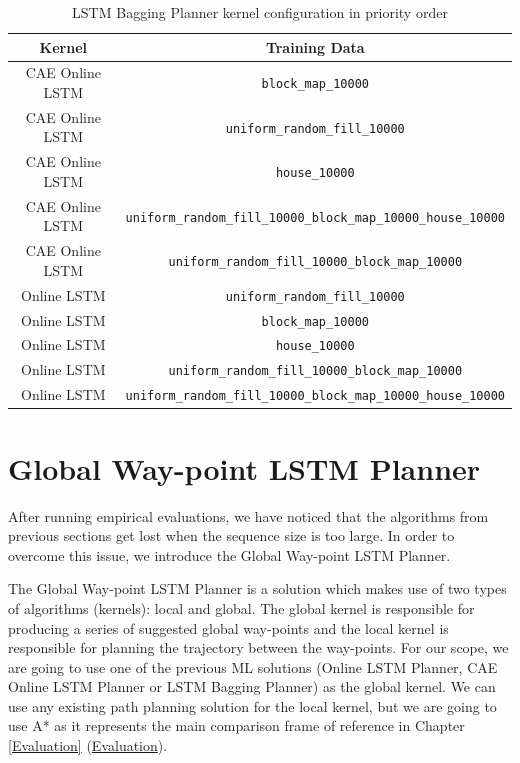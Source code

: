 \begin{table}[h!]
    \centering
    \begin{tabular}{|c|c|}
         \hline
         \textbf{Kernel} & \textbf{Training Data} \\
         \hline
         \hline
         CAE Online LSTM & \texttt{block\_map\_10000} \\
         \hline
         CAE Online LSTM & \texttt{uniform\_random\_fill\_10000} \\
         \hline
         CAE Online LSTM & \texttt{house\_10000} \\
         \hline
         CAE Online LSTM & \texttt{uniform\_random\_fill\_10000\_block\_map\_10000\_house\_10000} \\
         \hline
         CAE Online LSTM & \texttt{uniform\_random\_fill\_10000\_block\_map\_10000} \\
         \hline
         \hline
         Online LSTM & \texttt{uniform\_random\_fill\_10000} \\
         \hline
         Online LSTM & \texttt{block\_map\_10000} \\
         \hline
         Online LSTM & \texttt{house\_10000} \\
         \hline
         Online LSTM & \texttt{uniform\_random\_fill\_10000\_block\_map\_10000} \\
         \hline
         Online LSTM & \texttt{uniform\_random\_fill\_10000\_block\_map\_10000\_house\_10000} \\
         \hline
    \end{tabular}
    \caption{LSTM Bagging Planner kernel configuration in priority order}
    \label{tab:LSTM Bagging Planner config}
\end{table}

\pagebreak

\section{Global Way-point LSTM Planner} \label{sec: way point nav}
After running empirical evaluations, we have noticed that the algorithms from previous sections get lost when the sequence size is too large. In order to overcome this issue, we introduce the Global Way-point LSTM Planner.

The Global Way-point LSTM Planner is a solution which makes use of two types of algorithms (kernels): local and global. The global kernel is responsible for producing a series of suggested global way-points and the local kernel is responsible for planning the trajectory between the way-points. For our scope, we are going to use one of the previous ML solutions (Online LSTM Planner, CAE Online LSTM Planner or LSTM Bagging Planner) as the global kernel. We can use any existing path planning solution for the local kernel, but we are going to use A* as it represents the main comparison frame of reference in Chapter \ref {Evaluation} (\hyperref[Evaluation]{Evaluation}).

